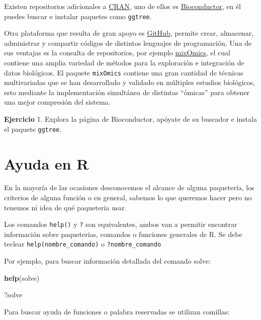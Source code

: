\documentclass[
]{book}
\newenvironment{Shaded}{\begin{snugshade}}{\end{snugshade}}
\newcommand{\FunctionTok}[1]{\textcolor[rgb]{0.13,0.29,0.53}{\textbf{#1}}}
\newcommand{\NormalTok}[1]{#1}
\begin{document}
Existen repositorios adicionales a \href{https://cran.r-project.org/}{CRAN}, uno de ellos es \href{https://https://bioconductor.org/}{Bioconductor}, en él puedes buscar e instalar paquetes como \texttt{ggtree}.

Otra plataforma que resulta de gran apoyo es \href{https://docs.github.com/es}{GitHub}, permite crear, almacenar, administrar y compartir códigos de distintos lenguajes de programación. Una de sus ventajas es la consulta de repositorios, por ejemplo \href{https://github.com/mixOmicsTeam/mixOmics}{mixOmics}, el cual contiene una amplia variedad de métodos para la exploración e integración de datos biológicos. El paquete \texttt{mixOmics} contiene una gran cantidad de técnicas multivariadas que se han desarrollado y validado en múltiples estudios biológicos, esto mediante la implementación simultánea de distintas ``ómicas'' para obtener una mejor compresión del sistema.

\textbf{Ejercicio}
1. Explora la página de Bioconductor, apóyate de su buscador e instala el paquete \texttt{ggtree}.

\section{Ayuda en R}\label{ayuda-en-r}

En la mayoría de las ocasiones desconocemos el alcance de alguna paquetería, los criterios de alguna función o en general, sabemos lo que queremos hacer pero no tenemos ni idea de qué paqueteria usar.

Los comandos \texttt{help()} y \texttt{?} son equivalentes, ambos van a permitir encontrar información sobre paqueterias, comandos o funciones generales de R. Se debe teclear \texttt{help(nombre\_comando)} o \texttt{?nombre\_comando}

Por ejemplo, para buscar información detallada del comando solve:

\begin{Shaded}
\begin{Highlighting}[]
\FunctionTok{help}\NormalTok{(solve)}
\end{Highlighting}
\end{Shaded}

\begin{Shaded}
\begin{Highlighting}[]
\NormalTok{?solve}
\end{Highlighting}
\end{Shaded}

Para buscar ayuda de funciones o palabra reservadas se utilizan comillas:
\end{document}
